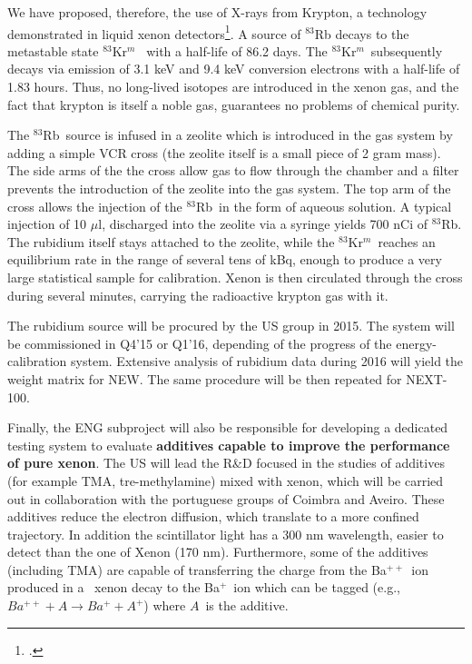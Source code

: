 We have proposed, therefore, the use of X-rays from Krypton, a technology demonstrated in liquid xenon detectors\footcite{Kastens:2009rt}. A source of $^{83}$Rb
decays to the metastable state  $^{83}$Kr$^m$~ with a half-life of 86.2 days. The
$^{83}$Kr$^m$~subsequently decays via emission of 3.1 keV and 9.4 keV conversion electrons with a half-life of 1.83 hours. Thus, no long-lived isotopes are introduced in the xenon gas, and the fact that krypton is itself a noble gas, guarantees no problems of chemical purity.  

The $^{83}$Rb~source is infused in a zeolite which is introduced in the gas system by adding a simple VCR cross (the zeolite itself is a small piece of 2 gram mass). The side arms of the the cross allow gas to flow through the chamber and a filter prevents the introduction of the zeolite into the gas system. The top arm of the cross allows the injection of the $^{83}$Rb~in the form of aqueous solution. A typical injection of 10 $\mu$l, discharged into the zeolite via a syringe yields 700 nCi of $^{83}$Rb. The rubidium itself stays attached to the zeolite, while the $^{83}$Kr$^m$~reaches an equilibrium rate in the range of several tens of kBq, enough to produce a very large statistical sample for calibration. Xenon is then circulated through the cross during several minutes, carrying the radioactive krypton gas with it.  

The rubidium source will be procured by the US group in 2015. The system will be commissioned in Q4'15 or Q1'16, depending of the progress of the energy-calibration system. Extensive analysis of rubidium data during 2016 will yield the weight matrix for NEW. The same procedure will be then repeated for NEXT-100. 

Finally, the ENG subproject will also be responsible for developing a dedicated testing system to evaluate {\bf additives capable to improve the performance of pure xenon}. The US will lead the R\&D focused in the studies of additives (for example TMA, tre-methylamine) mixed with xenon, which will be carried out in collaboration with the portuguese groups of Coimbra and Aveiro. These additives reduce the electron diffusion, which translate to a more confined trajectory.  In addition the scintillator light has  a 300 nm wavelength, easier to detect than the one of Xenon (170 nm). Furthermore, some of the additives (including TMA) are capable of transferring the charge from the Ba$^{++}$~ion produced in a \bb\ xenon decay to
the Ba$^{+}$~ion which can be tagged (e.g., $Ba^{++} + A \rightarrow Ba^{+} + A^{+}$) where $A$~is the additive. 

